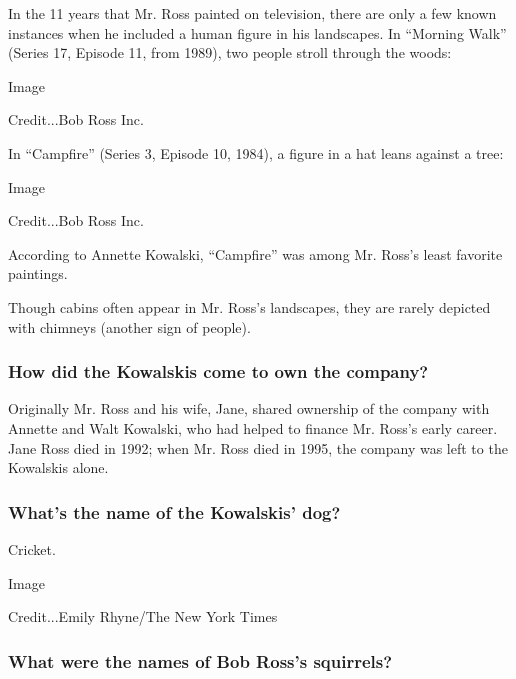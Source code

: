 In the 11 years that Mr. Ross painted on television, there are only a
few known instances when he included a human figure in his landscapes.
In ``Morning Walk'' (Series 17, Episode 11, from 1989), two people
stroll through the woods:

Image

Credit...Bob Ross Inc.

In ``Campfire'' (Series 3, Episode 10, 1984), a figure in a hat leans
against a tree:

Image

Credit...Bob Ross Inc.

According to Annette Kowalski, ``Campfire'' was among Mr. Ross's least
favorite paintings.

Though cabins often appear in Mr. Ross's landscapes, they are rarely
depicted with chimneys (another sign of people).

\hypertarget{how-did-the-kowalskis-come-to-own-the-company}{%
\subsubsection{\texorpdfstring{\textbf{How did the Kowalskis come to own
the
company?}}{How did the Kowalskis come to own the company?}}\label{how-did-the-kowalskis-come-to-own-the-company}}

Originally Mr. Ross and his wife, Jane, shared ownership of the company
with Annette and Walt Kowalski, who had helped to finance Mr. Ross's
early career. Jane Ross died in 1992; when Mr. Ross died in 1995, the
company was left to the Kowalskis alone.

\hypertarget{whats-the-name-of-the-kowalskis-dog}{%
\subsubsection{\texorpdfstring{\textbf{What's the name of the Kowalskis'
dog?}}{What's the name of the Kowalskis' dog?}}\label{whats-the-name-of-the-kowalskis-dog}}

Cricket.

Image

Credit...Emily Rhyne/The New York Times

\hypertarget{what-were-the-names-of-bob-rosss-squirrels}{%
\subsubsection{\texorpdfstring{\textbf{What were the names of Bob Ross's
squirrels?}}{What were the names of Bob Ross's squirrels?}}\label{what-were-the-names-of-bob-rosss-squirrels}}

